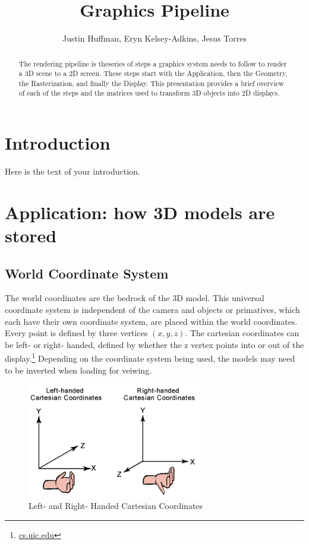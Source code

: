 \documentclass{article}
\begin{document}
\title{Graphics Pipeline}
\author{Justin Huffman, Eryn Kelsey-Adkins, Jesus Torres}

\maketitle

\begin{abstract}
The rendering pipeline is theseries of steps a graphics system needs to follow to render a 3D scene to a 2D screen. These steps start with the Application, then the Geometry, the Rasterization, and finally the Display. This presentation provides a brief overview of each of the steps and the matrices used to transform 3D objects into 2D displays.
\end{abstract}

\section{Introduction}
Here is the text of your introduction.

\section{Application: how 3D models are stored}

\subsection{World Coordinate System}
The world coordinates are the bedrock of the 3D model. This universal coordinate system is independent of the camera and objects or primatives, which each have their own coordinate system, are placed within the world coordinates. Every point is defined by three vertices $(x, y, z)$. The cartesian coordinates can be left- or right- handed, defined by whether the z vertex points into or out of the display.\footnote{\url{cs.uic.edu}} Depending on the coordinate system being used, the models may need to be inverted when loading for veiwing.

\begin{figure}[H]
    \centering
    \includegraphics[width=3.0in]{leftrght.png}
    \caption{Left- and Right- Handed Cartesian Coordinates}
    \label{LeftRight}
\end{figure}
\end{document}
